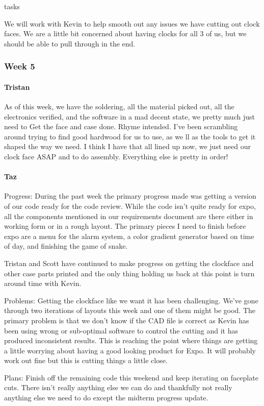 tasks\documentclass[onecolumn, draftclsnofoot,10pt, compsoc]{IEEEtran}
\begin{document}
We will work with Kevin to help smooth out any issues we have cutting out clock faces. We are a little bit concerned about having clocks for all 3 of us, but we should be able to pull through in the end.
\subsubsection{Week 5}
\paragraph{Tristan}
As of this week, we have the soldering, all the material picked out, all the electronics verified, and the software in a mad decent state, we pretty much just need to Get the face and case done. Rhyme intended. I've been scrambling around trying to find good hardwood for us to use, as we ll as the tools to get it shaped the way we need. I think I have that all lined up now, we just need our clock face ASAP and to do assembly. Everything else is pretty in order!

\paragraph{Taz}
Progress: During the past week the primary progress made was getting a version of our code ready for the code review. While the code isn't quite ready for expo, all the components mentioned in our requirements document are there either in working form or in a rough layout. The primary pieces I need to finish before expo are a menu for the alarm system, a color gradient generator based on time of day, and finishing the game of snake.

Tristan and Scott have continued to make progress on getting the clockface and other case parts printed and the only thing holding us back at this point is turn around time with Kevin.

Problems: Getting the clockface like we want it has been challenging. We've gone through two iterations of layouts this week and one of them might be good. The primary problem is that we don't know if the CAD file is correct as Kevin has been using wrong or sub-optimal software to control the cutting and it has produced inconsistent results. This is reaching the point where things are getting a little worrying about having a good looking product for Expo. It will probably work out fine but this is cutting things a little close.

Plans: Finish off the remaining code this weekend and keep iterating on faceplate cuts. There isn't really anything else we can do and thankfully not really anything else we need to do except the midterm progress update.
\end{document}
